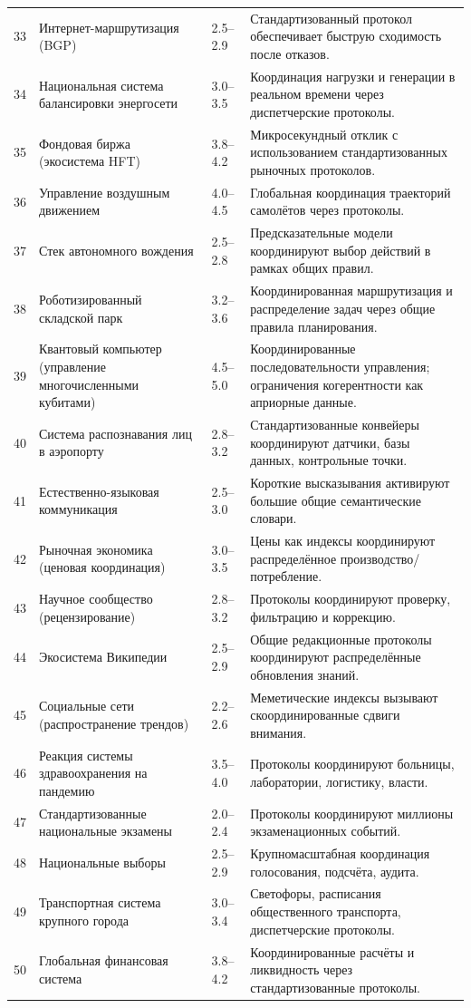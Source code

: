 \documentclass[11pt,a4paper]{article}
\begin{document}
\begin{longtable}{|p{0.8cm}|p{6.2cm}|p{3.0cm}|p{5.7cm}|}
		33 & Интернет-маршрутизация (BGP) & 2.5--2.9 & Стандартизованный протокол обеспечивает быструю сходимость после отказов. \\
		34 & Национальная система балансировки энергосети & 3.0--3.5 & Координация нагрузки и генерации в реальном времени через диспетчерские протоколы. \\
		35 & Фондовая биржа (экосистема HFT) & 3.8--4.2 & Микросекундный отклик с использованием стандартизованных рыночных протоколов. \\
		36 & Управление воздушным движением & 4.0--4.5 & Глобальная координация траекторий самолётов через протоколы. \\
		37 & Стек автономного вождения & 2.5--2.8 & Предсказательные модели координируют выбор действий в рамках общих правил. \\
		38 & Роботизированный складской парк & 3.2--3.6 & Координированная маршрутизация и распределение задач через общие правила планирования. \\
		39 & Квантовый компьютер (управление многочисленными кубитами) & 4.5--5.0 & Координированные последовательности управления; ограничения когерентности как априорные данные. \\
		40 & Система распознавания лиц в аэропорту & 2.8--3.2 & Стандартизованные конвейеры координируют датчики, базы данных, контрольные точки. \\
		41 & Естественно-языковая коммуникация & 2.5--3.0 & Короткие высказывания активируют большие общие семантические словари. \\
		42 & Рыночная экономика (ценовая координация) & 3.0--3.5 & Цены как индексы координируют распределённое производство/потребление. \\
		43 & Научное сообщество (рецензирование) & 2.8--3.2 & Протоколы координируют проверку, фильтрацию и коррекцию. \\
		44 & Экосистема Википедии & 2.5--2.9 & Общие редакционные протоколы координируют распределённые обновления знаний. \\
		45 & Социальные сети (распространение трендов) & 2.2--2.6 & Меметические индексы вызывают скоординированные сдвиги внимания. \\
		46 & Реакция системы здравоохранения на пандемию & 3.5--4.0 & Протоколы координируют больницы, лаборатории, логистику, власти. \\
		47 & Стандартизованные национальные экзамены & 2.0--2.4 & Протоколы координируют миллионы экзаменационных событий. \\
		48 & Национальные выборы & 2.5--2.9 & Крупномасштабная координация голосования, подсчёта, аудита. \\
		49 & Транспортная система крупного города & 3.0--3.4 & Светофоры, расписания общественного транспорта, диспетчерские протоколы. \\
		50 & Глобальная финансовая система & 3.8--4.2 & Координированные расчёты и ликвидность через стандартизованные протоколы. \\
		\hline
	\end{longtable}
	
\end{document}
